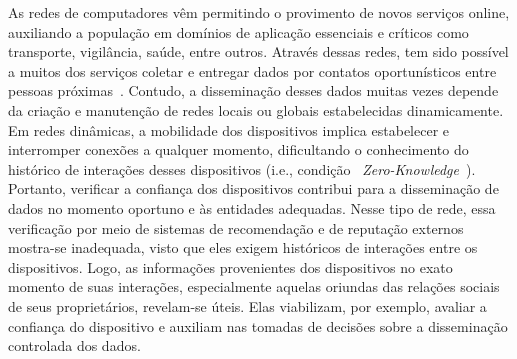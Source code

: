 \documentclass[12pt]{article}
\newcommand{\as}[1]{\textcolor{blue}{{\bf #1}}}
\newcommand{\al}[1]{\textcolor{brown}{{\bf #1}}}
\begin{document}
As redes de computadores vêm permitindo o provimento de novos serviços online, auxiliando a população em domínios de aplicação essenciais e críticos como transporte, vigilância, saúde, entre outros. Através dessas redes, 
tem sido %
possível a muitos dos serviços 
coletar e entregar dados 
por contatos oportunísticos entre pessoas próximas~\cite{garyfalos2008coupons}. 
Contudo, a disseminação desses dados muitas vezes depende da criação e manutenção de redes locais ou globais estabelecidas dinamicamente. Em redes dinâmicas, a mobilidade dos dispositivos implica estabelecer e interromper conexões a qualquer momento, 
dificultando
o conhecimento do histórico de interações desses dispositivos (i.e., condição ~\textit{Zero-Knowledge}~\cite{feige1988zero,kim2015hcs}). %
Portanto, 
verificar a confiança dos dispositivos contribui para a  disseminação de dados no momento oportuno e às entidades adequadas.
Nesse tipo de rede,
essa verificação por meio de
sistemas de recomendação e de reputação
externos
mostra-se
inadequada,
visto que eles
exigem
históricos de interações entre os dispositivos.
Logo, %
as
informações
provenientes
dos
dispositivos no exato momento de suas interações, especialmente aquelas oriundas das relações sociais de seus proprietários, revelam-se
úteis.
Elas
viabilizam,
por exemplo, avaliar a confiança do dispositivo e auxiliam nas tomadas de decisões sobre a disseminação controlada dos dados.


\end{document}
